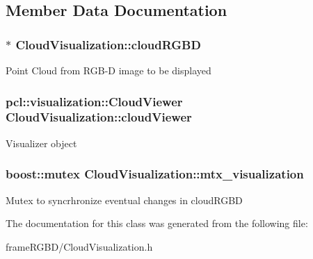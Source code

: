 \subsection{\-Member \-Data \-Documentation}
\hypertarget{classCloudVisualization_afda3094aaee3c06cbe5fb004b9a14f68}{
\subsubsection[{cloud\-R\-G\-B\-D}]{$\ast$ {\bf \-Cloud\-Visualization\-::cloud\-R\-G\-B\-D}}}\label{classCloudVisualization_afda3094aaee3c06cbe5fb004b9a14f68}
\-Point \-Cloud from \-R\-G\-B-\/\-D image to be displayed \hypertarget{classCloudVisualization_af2d2977ac87ebe1bf9ae8dbf34851e15}{
\subsubsection[{cloud\-Viewer}]{\setlength{\rightskip}{0pt plus 5cm}pcl\-::visualization\-::\-Cloud\-Viewer {\bf \-Cloud\-Visualization\-::cloud\-Viewer}}}\label{classCloudVisualization_af2d2977ac87ebe1bf9ae8dbf34851e15}
\-Visualizer object \hypertarget{classCloudVisualization_a60ec9169f4b99d64b6a9248f2e4f469c}{
\subsubsection[{mtx\-\_\-visualization}]{\setlength{\rightskip}{0pt plus 5cm}boost\-::mutex {\bf \-Cloud\-Visualization\-::mtx\-\_\-visualization}}}\label{classCloudVisualization_a60ec9169f4b99d64b6a9248f2e4f469c}
\-Mutex to syncrhronize eventual changes in cloud\-R\-G\-B\-D 

\-The documentation for this class was generated from the following file\-:\begin{DoxyCompactItemize}
\item 
frame\-R\-G\-B\-D/\-Cloud\-Visualization.\-h\end{DoxyCompactItemize}
